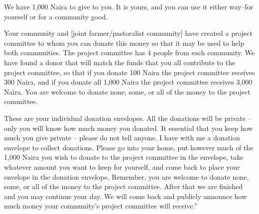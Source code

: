 \documentclass[
]{article}
\begin{document}
We have 1,000 Naira to give to you. It is yours, and you can use it
either way--for yourself or for a community good.

Your community and {[}joint farmer/pastoralist community{]} have created
a project committee to whom you can donate this money so that it may be
used to help both communities. The project committee has 4 people from
each community. We have found a donor that will match the funds that you
all contribute to the project committee, so that if you donate 100 Naira
the project committee receives 300 Naira, and if you donate all 1,000
Naira the project committee receives 3,000 Naira. You are welcome to
donate none, some, or all of the money to the project committee.

These are your individual donation envelopes. All the donations will be
private -- only you will know how much money you donated. It essential
that you keep how much you give private -- please do not tell anyone. I
have with me a donation envelope to collect donations. Please go into
your home, put however much of the 1,000 Naira you wish to donate to the
project committee in the envelope, take whatever amount you want to keep
for yourself, and come back to place your envelope in the donation
envelope. Remember, you are welcome to donate none, some, or all of the
money to the project committee. After that we are finished and you may
continue your day. We will come back and publicly announce how much
money your community's project committee will receive.''
\end{document}
